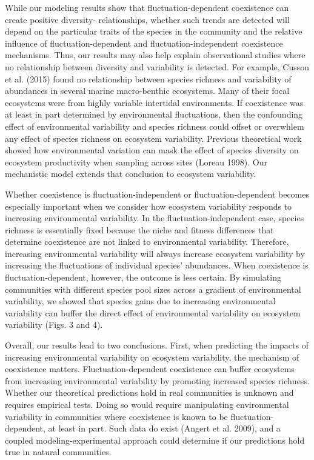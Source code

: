 \documentclass[12pt,]{article}
\begin{document}
While our modeling results show that fluctuation-dependent coexistence
can create positive diversity- relationships,
whether such trends are detected will depend on the particular traits of
the species in the community and the relative influence of
fluctuation-dependent and fluctuation-independent coexistence
mechanisms. Thus, our results may also help explain observational
studies where no relationship between diversity and variability is
detected. For example, Cusson et al. (2015) found no relationship
between species richness and variability of abundances in several marine
macro-benthic ecosystems. Many of their focal ecosystems were from
highly variable intertidal environments. If coexistence was at least in
part determined by environmental fluctuations, then the confounding
effect of environmental variability and species richness could offset or
overwhlem any effect of species richness on ecosystem variability.
Previous theoretical work showed how environmental variation can mask
the effect of species diversity on ecosystem productivity when sampling
across sites (Loreau 1998). Our mechanistic model extends that
conclusion to ecosystem variability.

Whether coexistence is fluctuation-independent or fluctuation-dependent
becomes especially important when we consider how ecosystem variability
responds to increasing environmental variability. In the
fluctuation-independent case, species richness is essentially fixed
because the niche and fitness differences that determine coexistence are
not linked to environmental variability. Therefore, increasing
environmental variability will always increase ecosystem variability by
increasing the fluctuations of individual species' abundances. When
coexistence is fluctuation-dependent, however, the outcome is less
certain. By simulating communities with different species pool sizes
across a gradient of environmental variability, we showed that species
gains due to increasing environmental variability can buffer the direct
effect of environmental variability on ecosystem variability (Figs. 3
and 4).

Overall, our results lead to two conclusions. First, when predicting the
impacts of increasing environmental variability on ecosystem
variability, the mechanism of coexistence matters. Fluctuation-dependent
coexistence can buffer ecosystems from increasing environmental
variability by promoting increased species richness. Whether our
theoretical predictions hold in real communities is unknown and requires
empirical tests. Doing so would require manipulating environmental
variability in communities where coexistence is known to be
fluctuation-dependent, at least in part. Such data do exist (Angert et
al. 2009), and a coupled modeling-experimental approach could determine
if our predictions hold true in natural communities.
\end{document}
